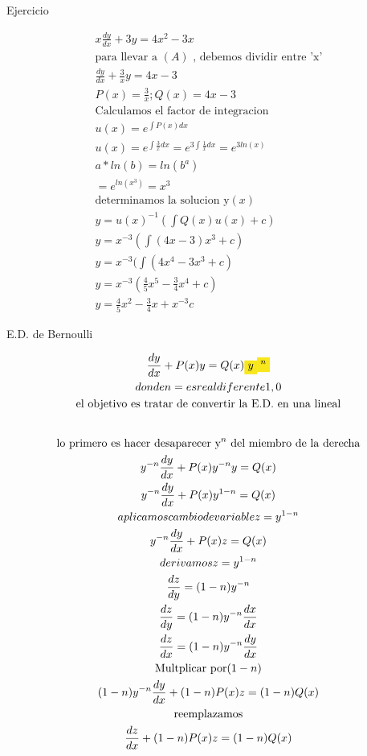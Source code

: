 \documentclass{article}
\begin{document}
Ejercicio


\begin{gather*}
x\frac{dy}{dx}+3y= 4x^{2}-3x \\
\text{para llevar a }(A)\text{ , debemos dividir entre 'x'} \\
\frac{dy}{dx}+\frac{3}{x}y= 4x-3 \\
P(x) = \frac{3}{x};  Q(x)=4x-3 \\
\text{Calculamos el factor de integracion} \\
u(x) = e^{\int P(x)dx} \\
u(x) = e^{\int \frac{3}{x}dx}=e^{3\int \frac{1}{x}dx}= e^{3ln(x)} \\
a*ln(b)  = ln(b^{a}) \\
=e^{ln(x^{3})}=x^{3} \\
\text{determinamos la solucion y}(x) \\
y = u(x) ^{-1}(\int Q(x)u(x) +c) \\
y = x ^{-3}(\int (4x-3)x^{3} +c) \\
y = x ^{-3}(\int (4x^{4}-3x^{3} +c) \\
y = x ^{-3}( \frac{4}{5}x^{5}-\frac{3}{4}x^{4}+c) \\
y = \frac{4}{5}x^{2}-\frac{3}{4}x+x ^{-3}c
\end{gather*}


E.D. de Bernoulli


\begin{gather*}
\frac{dy}{dx} + P(x)y = Q(x)\text{\colorbox[RGB]{248,231,28}{$y$}}\text{\colorbox[RGB]{248,231,28}{$^{n}$}} \\
donde n = es real diferente 1, 0 \\
\text{el objetivo es tratar de convertir la E.D. en una lineal} \\
\vspace{0.5em} \\
\text{lo primero es hacer desaparecer y}^{n}\text{ del miembro de la derecha} \\
y^{-n}\frac{dy}{dx} + P(x)y^{-n}y = Q(x) \\
y^{-n}\frac{dy}{dx} + P(x)y^{1-n} = Q(x) \\
aplicamos cambio de variable z = y^{1-n} \\
y^{-n}\frac{dy}{dx} + P(x)z = Q(x) \\
derivamos z = y^{1-n} \\
\frac{dz}{dy} =(1-n)y^{-n}  \\
\frac{dz}{dy} =(1-n)y^{-n} \frac{dx}{dx} \\
\frac{dz}{dx} =(1-n)y^{-n} \frac{dy}{dx} \\
\text{Multplicar por}(1-n) \\
(1-n)y^{-n}\frac{dy}{dx} + (1-n)P(x)z = (1-n)Q(x) \\
\text{reemplazamos} \\
\frac{dz}{dx} + (1-n)P(x)z = (1-n)Q(x)
\end{gather*}
\end{document}
